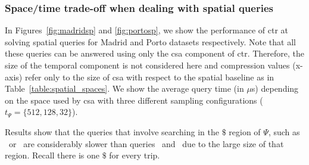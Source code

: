 

	\subsubsection{Space/time trade-off when dealing with spatial queries} \label{sec:exp:spat}

	In Figures~\ref{fig:madridsp} and \ref{fig:portosp}, we show the performance of \gls{ctr} at
	solving spatial queries for Madrid and Porto datasets respectively. 
	Note that all these queries can be answered using only the \gls{csa} component
	of \gls{ctr}. Therefore, the size of the temporal component 
	is not considered here and compression values (x-axis) refer only to the size of \gls{csa} with
	respect to the spatial baseline as in Table~\ref{table:spatial_spaces}. 
	We show the average query time (in $\mu$s) depending on the
	space used by \gls{csa} with three different 
	sampling configurations ($t_{\Psi} =\{512, 128, 32\}$).


	Results show that the queries that involve searching in the $\$$ region of 
	$\Psi$, such as \startX\ or \XtoY\ are considerably slower than queries \endX\ and \loadX\ 
	due to the large size of that region. Recall there is one $\$$ for every trip. 



